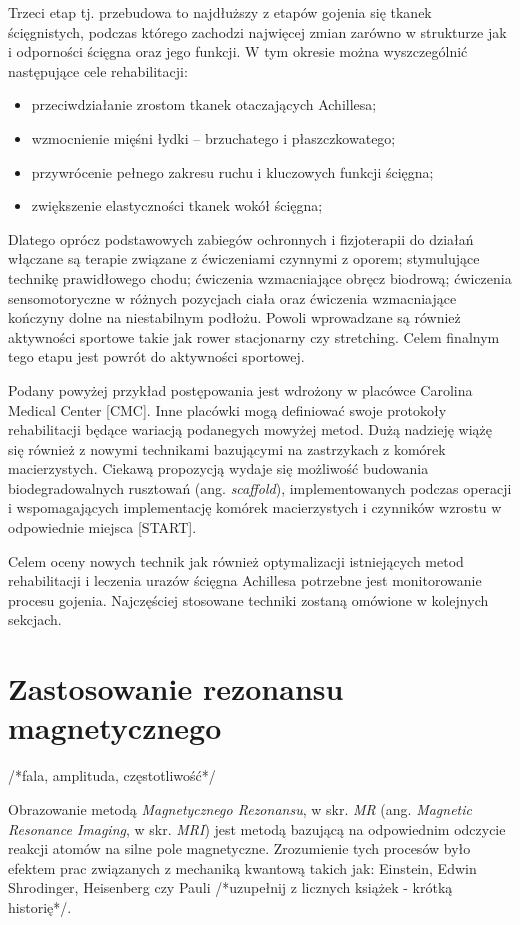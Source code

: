 Trzeci etap tj. przebudowa to najdłuższy z etapów gojenia się tkanek ścięgnistych, podczas którego zachodzi najwięcej zmian zarówno w strukturze jak i odporności ścięgna oraz jego funkcji. W tym okresie można wyszczególnić następujące cele rehabilitacji: 
\begin{itemize}
	\item przeciwdziałanie zrostom tkanek otaczających Achillesa; 
	\item wzmocnienie mięśni łydki – brzuchatego i płaszczkowatego; 
	\item przywrócenie pełnego zakresu ruchu i kluczowych funkcji ścięgna; 
	\item zwiększenie elastyczności tkanek wokół ścięgna;
\end{itemize}

Dlatego oprócz podstawowych zabiegów ochronnych i fizjoterapii do działań włączane są terapie związane z ćwiczeniami czynnymi z oporem; stymulujące technikę prawidłowego chodu; ćwiczenia wzmacniające obręcz biodrową; ćwiczenia sensomotoryczne w różnych pozycjach ciała oraz ćwiczenia wzmacniające kończyny dolne na niestabilnym podłożu. Powoli wprowadzane są również aktywności sportowe takie jak rower stacjonarny czy stretching. Celem finalnym tego etapu jest powrót do aktywności sportowej. 

Podany powyżej przykład postępowania jest wdrożony w placówce Carolina Medical Center [CMC]. Inne placówki mogą definiować swoje protokoły rehabilitacji będące wariacją podanegych mowyżej metod. Dużą nadzieję wiążę się również z nowymi technikami bazującymi na zastrzykach z komórek macierzystych. Ciekawą propozycją wydaje się możliwość budowania biodegradowalnych rusztowań (ang. \textit{scaffold}), implementowanych podczas operacji i wspomagających implementację komórek macierzystych i czynników wzrostu w odpowiednie miejsca [START].

Celem oceny nowych technik jak również optymalizacji istniejących metod rehabilitacji i leczenia urazów ścięgna Achillesa potrzebne jest monitorowanie procesu gojenia. Najczęściej stosowane techniki zostaną omówione w kolejnych sekcjach.

\section{Zastosowanie rezonansu magnetycznego}
/*fala, amplituda, częstotliwość*/ 

Obrazowanie metodą \textit{Magnetycznego Rezonansu}, w skr. \textit{MR} (ang. \textit{Magnetic Resonance Imaging}, w skr. \textit{MRI}) jest metodą bazującą na odpowiednim odczycie reakcji atomów na silne pole magnetyczne. Zrozumienie tych procesów było efektem prac związanych z mechaniką kwantową takich jak: Einstein, Edwin Shrodinger, Heisenberg czy Pauli /*uzupełnij z licznych książek - krótką historię*/. 

